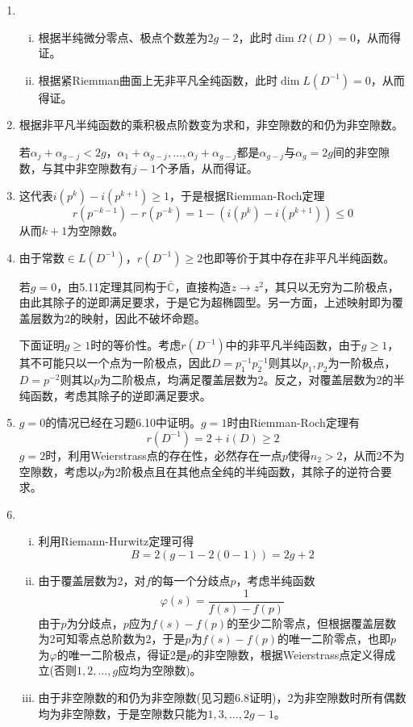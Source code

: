 \documentclass[a4paper,UTF8,fontset=windows,10pt]{ctexart}
\begin{document}
\begin{enumerate}
    \item
    \begin{enumerate}[(i)]
        \item 根据半纯微分零点、极点个数差为$2g-2$，此时$\dim\Omega(D)=0$，从而得证。
        \item 根据紧Riemman曲面上无非平凡全纯函数，此时$\dim L(D^{-1})=0$，从而得证。
    \end{enumerate}

    \item
    根据非平凡半纯函数的乘积极点阶数变为求和，非空隙数的和仍为非空隙数。

    若$\alpha_j+\alpha_{g-j}<2g$，$\alpha_1+\alpha_{g-j},\dots,\alpha_j+\alpha_{g-j}$都是$\alpha_{g-j}$与$\alpha_g=2g$间的非空隙数，与其中非空隙数有$j-1$个矛盾，从而得证。

    \item
    这代表$i(p^k)-i(p^{k+1})\ge1$，于是根据Riemman-Roch定理
    $$r(p^{-k-1})-r(p^{-k})=1-(i(p^k)-i(p^{k+1}))\le0$$
    从而$k+1$为空隙数。

    \item
    由于常数$\in L(D^{-1})$，$r(D^{-1})\ge2$也即等价于其中存在非平凡半纯函数。

    若$g=0$，由5.11定理其同构于$\bar{\mathbb{C}}$，直接构造$z\to z^2$，其只以无穷为二阶极点，由此其除子的逆即满足要求，于是它为超椭圆型。另一方面，上述映射即为覆盖层数为2的映射，因此不破坏命题。
    
    下面证明$g\ge1$时的等价性。考虑$r(D^{-1})$中的非平凡半纯函数，由于$g\ge1$，其不可能只以一个点为一阶极点，因此$D=p_1^{-1}p_2^{-1}$则其以$p_1,p_2$为一阶极点，$D=p^{-2}$则其以$p$为二阶极点，均满足覆盖层数为2。反之，对覆盖层数为2的半纯函数，考虑其除子的逆即满足要求。

    \item
    $g=0$的情况已经在习题6.10中证明。$g=1$时由Riemman-Roch定理有
    $$r(D^{-1})=2+i(D)\ge2$$
    $g=2$时，利用Weierstrass点的存在性，必然存在一点$p$使得$n_2>2$，从而2不为空隙数，考虑以$p$为2阶极点且在其他点全纯的半纯函数，其除子的逆符合要求。

    \item
    \begin{enumerate}[(i)]
        \item 利用Riemann-Hurwitz定理可得
        $$B=2(g-1-2(0-1))=2g+2$$
        \item 由于覆盖层数为2，对$f$的每一个分歧点$p$，考虑半纯函数
        $$\varphi(s)=\frac{1}{f(s)-f(p)}$$
        由于$p$为分歧点，$p$应为$f(s)-f(p)$的至少二阶零点，但根据覆盖层数为2可知零点总阶数为2，于是$p$为$f(s)-f(p)$的唯一二阶零点，也即$p$为$\varphi$的唯一二阶极点，得证2是$p$的非空隙数，根据Weierstrass点定义得成立(否则$1,2,\dots,g$应均为空隙数)。
        \item 由于非空隙数的和仍为非空隙数(见习题6.8证明)，2为非空隙数时所有偶数均为非空隙数，于是空隙数只能为$1,3,\dots,2g-1$。
        

\end{enumerate}
\end{enumerate}
\end{document}
